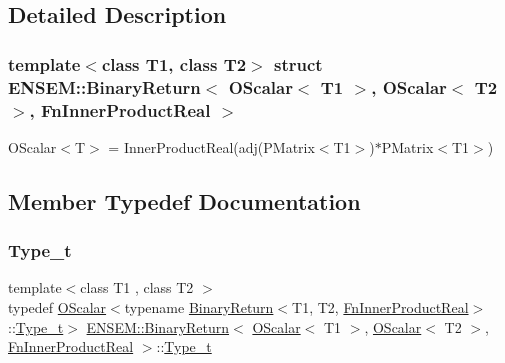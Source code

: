 \subsection{Detailed Description}
\subsubsection*{template$<$class T1, class T2$>$\newline
struct E\+N\+S\+E\+M\+::\+Binary\+Return$<$ O\+Scalar$<$ T1 $>$, O\+Scalar$<$ T2 $>$, Fn\+Inner\+Product\+Real $>$}

O\+Scalar$<$\+T$>$ = Inner\+Product\+Real(adj(\+P\+Matrix$<$\+T1$>$)$\ast$\+P\+Matrix$<$\+T1$>$) 

\subsection{Member Typedef Documentation}
\mbox{\label{structENSEM_1_1BinaryReturn_3_01OScalar_3_01T1_01_4_00_01OScalar_3_01T2_01_4_00_01FnInnerProductReal_01_4_a7660dd8ee24814192b25ecbb29c86a33}} 
\subsubsection{\texorpdfstring{Type\_t}{Type\_t}\hspace{0.1cm}{\footnotesize\ttfamily [1/2]}}
{\footnotesize\ttfamily template$<$class T1 , class T2 $>$ \\
typedef \mbox{\hyperlink{classENSEM_1_1OScalar}{O\+Scalar}}$<$typename \mbox{\hyperlink{structENSEM_1_1BinaryReturn}{Binary\+Return}}$<$T1, T2, \mbox{\hyperlink{structENSEM_1_1FnInnerProductReal}{Fn\+Inner\+Product\+Real}}$>$\+::\mbox{\hyperlink{structENSEM_1_1BinaryReturn_3_01OScalar_3_01T1_01_4_00_01OScalar_3_01T2_01_4_00_01FnInnerProductReal_01_4_a7660dd8ee24814192b25ecbb29c86a33}{Type\+\_\+t}}$>$ \mbox{\hyperlink{structENSEM_1_1BinaryReturn}{E\+N\+S\+E\+M\+::\+Binary\+Return}}$<$ \mbox{\hyperlink{classENSEM_1_1OScalar}{O\+Scalar}}$<$ T1 $>$, \mbox{\hyperlink{classENSEM_1_1OScalar}{O\+Scalar}}$<$ T2 $>$, \mbox{\hyperlink{structENSEM_1_1FnInnerProductReal}{Fn\+Inner\+Product\+Real}} $>$\+::\mbox{\hyperlink{structENSEM_1_1BinaryReturn_3_01OScalar_3_01T1_01_4_00_01OScalar_3_01T2_01_4_00_01FnInnerProductReal_01_4_a7660dd8ee24814192b25ecbb29c86a33}{Type\+\_\+t}}}

